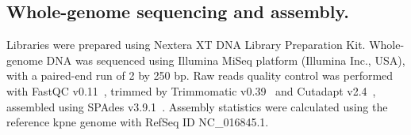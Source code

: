 \documentclass[12pt,a4paper]{article}
\begin{document}
\subsection{Whole-genome sequencing and assembly.}\label{subsec:proc_raw}
Libraries were prepared using Nextera XT DNA Library Preparation Kit.
Whole-genome DNA was sequenced using Illumina MiSeq platform (Illumina Inc., USA),
with a paired-end run of 2 by 250 bp.
Raw reads quality control was performed with FastQC v0.11~\cite{FastQC},  %
trimmed by Trimmomatic v0.39~\cite{Trimmomatic}
and Cutadapt v2.4~\cite{Cutadapt},
assembled using SPAdes v3.9.1~\cite{SPAdes}.
Assembly statistics were calculated using the reference \gls{kpne} genome with RefSeq ID NC\_016845.1.
\end{document}
